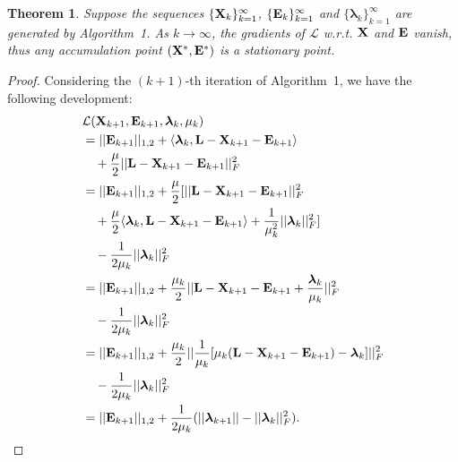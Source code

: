 \documentclass[10pt,twocolumn,letterpaper]{article}
\newtheorem{theorem}{Theorem}
\def\bE{{\bf E}}
\def\blambda{{\bm \lambda}}
\def\calL{{\mathcal{L}}}
\def\bL{{\bf L}}
\def\bX{{\bf X}}
\def\bX{{\bf X}}
\begin{document}
\begin{theorem}
\label{theorem:alm_convergence}
  Suppose the sequences $\{\bX_k\}_{k=1}^{\infty}$, $\{\bE_k\}_{k=1}^{\infty}$ and $\{\blambda_k\}_{k=1}^{\infty}$ are generated by Algorithm~1.
  As $k \to \infty$, the gradients of $\calL$ w.r.t. $\bX$ and $\bE$ vanish,
  thus any accumulation point $(\bX^*, \bE^*)$ is a stationary point.
\end{theorem}


\begin{proof}
    Considering the $(k+1)$-th iteration of Algorithm~1, we have the following development:
    \begin{align}
    \label{eq:proof1}
      & \calL(\bX_{k+1}, \bE_{k+1}, \blambda_{k}, \mu_{k})   \nonumber \\
      & = || \bE_{k+1} ||_{1,2} + \langle \blambda_{k}, \bL - \bX_{k+1} - \bE_{k+1} \rangle  \nonumber \\
      & \quad + \frac{\mu}{2} || \bL - \bX_{k+1} - \bE_{k+1} ||_{F}^2         \nonumber \\
      & = || \bE_{k+1} ||_{1,2} + \frac{\mu}{2} [ || \bL - \bX_{k+1} - \bE_{k+1} ||_{F}^2  \nonumber \\
      & \quad + \frac{\mu}{2} \langle \blambda_{k}, \bL - \bX_{k+1} - \bE_{k+1} \rangle + \frac{1}{\mu_{k}^2} || \blambda_k ||_F^2 ] \nonumber \\
      & \quad - \frac{1}{2\mu_k} || \blambda_k ||_F^2    \nonumber  \\
      & = || \bE_{k+1} ||_{1,2} + \frac{\mu_k}{2} || \bL - \bX_{k+1} - \bE_{k+1} + \frac{\blambda_k}{\mu_k} ||_F^2 \nonumber \\
      & \quad - \frac{1}{2\mu_k} || \blambda_k ||_F^2   \nonumber \\
      & = || \bE_{k+1} ||_{1,2} + \frac{\mu_k}{2} || \frac{1}{\mu_k} [ \mu_k (\bL - \bX_{k+1} - \bE_{k+1}) - \blambda_k ] ||_F^2  \nonumber \\
      & \quad - \frac{1}{2\mu_k} || \blambda_k ||_F^2   \nonumber \\
      & = || \bE_{k+1} ||_{1,2} + \frac{1}{2\mu_k} ( || \blambda_{k+1} || - || \blambda_{k} ||_F^2 )   .

\end{align}
\end{proof}
\end{document}
